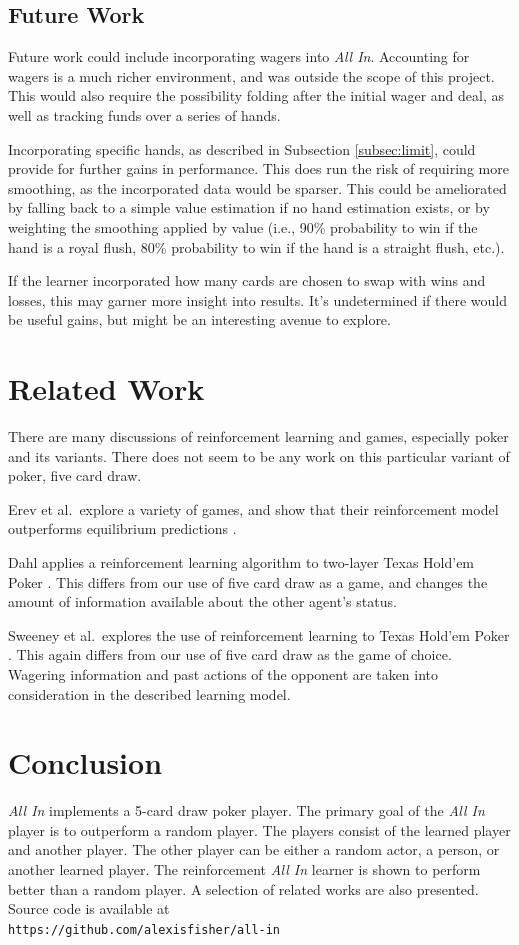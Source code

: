 \documentclass[12pt,pdftex]{article}
\begin{document}
\subsection{Future Work}
Future work could include incorporating wagers into \emph{All In}.  
Accounting for wagers is a much richer environment, and was outside the scope of this project.  
This would also require the possibility folding after the initial wager and deal, as well as tracking funds over a series of hands.

Incorporating specific hands, as described in Subsection \ref{subsec:limit}, could provide for further gains in performance.
This does run the risk of requiring more smoothing, as the incorporated data would be sparser.
This could be ameliorated by falling back to a simple value estimation if no hand estimation exists, or by weighting the smoothing applied by value (i.e., 90\% probability to win if the hand is a royal flush, 80\% probability to win if the hand is a straight flush, etc.).

If the learner incorporated how many cards are chosen to swap with wins and losses, this may garner more insight into results.
It's undetermined if there would be useful gains, but might be an interesting avenue to explore.

\section{Related Work} \label{sec:related}
There are many discussions of reinforcement learning and games, especially poker and its variants.
There does not seem to be any work on this particular variant of poker, five card draw.  

Erev et al.\ explore a variety of games, and show that their reinforcement model outperforms equilibrium predictions \cite{Erev98}.  

Dahl applies a reinforcement learning algorithm to two-layer Texas Hold'em Poker \cite{Dahl01}. 
This differs from our use of five card draw as a game, and changes the amount of information available about the other agent's status. 

Sweeney et al.\ explores the use of reinforcement learning to Texas Hold'em Poker \cite{Sweeney}.
This again differs from our use of five card draw as the game of choice.  
Wagering information and past actions of the opponent are taken into consideration in the described learning model.

\section{Conclusion} \label{sec:conclusion}
\emph{All In} implements a 5-card draw poker player. 
The primary goal of the \emph{All In} player is to outperform a random player. 
The players consist of the learned player and another player. 
The other player can be either a random actor, a person, or another learned player. 
The reinforcement \emph{All In} learner is shown to perform better than a random player.
A selection of related works are also presented.
Source code is available at \\ \texttt{https://github.com/alexisfisher/all-in}
\end{document}
